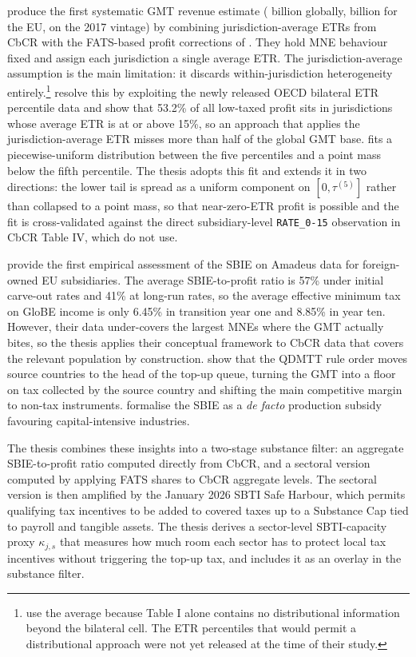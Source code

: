 \documentclass[11pt,a4paper]{article}
\newcommand{\EUR}{\texteuro}
\newcommand{\code}[1]{\texttt{#1}}
\begin{document}
\citet{barake2022} produce the first systematic GMT revenue estimate (\EUR179 billion globally, \EUR55 billion for the EU, on the 2017 vintage) by combining jurisdiction-average ETRs from CbCR with the FATS-based profit corrections of \citet{torslov2023}. They hold MNE behaviour fixed and assign each jurisdiction a single average ETR. The jurisdiction-average assumption is the main limitation: it discards within-jurisdiction heterogeneity entirely.\footnote{\citet{barake2022} use the average because Table I alone contains no distributional information beyond the bilateral cell. The ETR percentiles that would permit a distributional approach were not yet released at the time of their study.} \citet{hugger2026} resolve this by exploiting the newly released OECD bilateral ETR percentile data and show that 53.2\% of all low-taxed profit sits in jurisdictions whose average ETR is at or above 15\%, so an approach that applies the jurisdiction-average ETR misses more than half of the global GMT base. \citet{hugger2026} fits a piecewise-uniform distribution between the five percentiles and a point mass below the fifth percentile. The thesis adopts this fit and extends it in two directions: the lower tail is spread as a uniform component on $[0, \tau^{(5)}]$ rather than collapsed to a point mass, so that near-zero-ETR profit is possible and the fit is cross-validated against the direct subsidiary-level \code{RATE\_0-15} observation in CbCR Table IV, which \citet{hugger2026} do not use.

\citet{devereux2023} provide the first empirical assessment of the SBIE on Amadeus data for foreign-owned EU subsidiaries. The average SBIE-to-profit ratio is 57\% under initial carve-out rates and 41\% at long-run rates, so the average effective minimum tax on GloBE income is only 6.45\% in transition year one and 8.85\% in year ten. However, their data under-covers the largest MNEs where the GMT actually bites, so the thesis applies their conceptual framework to CbCR data that covers the relevant population by construction. \citet{devereux2022} show that the QDMTT rule order moves source countries to the head of the top-up queue, turning the GMT into a floor on tax collected by the source country and shifting the main competitive margin to non-tax instruments. \citet{schjelderup2024} formalise the SBIE as a \emph{de facto} production subsidy favouring capital-intensive industries. 

The thesis combines these insights into a two-stage substance filter: an aggregate SBIE-to-profit ratio computed directly from CbCR, and a sectoral version computed by applying FATS shares to CbCR aggregate levels. The sectoral version is then amplified by the January 2026 SBTI Safe Harbour, which permits qualifying tax incentives to be added to covered taxes up to a Substance Cap tied to payroll and tangible assets. The thesis derives a sector-level SBTI-capacity proxy $\kappa_{j,s}$ that measures how much room each sector has to protect local tax incentives without triggering the top-up tax, and includes it as an overlay in the substance filter.
\end{document}
